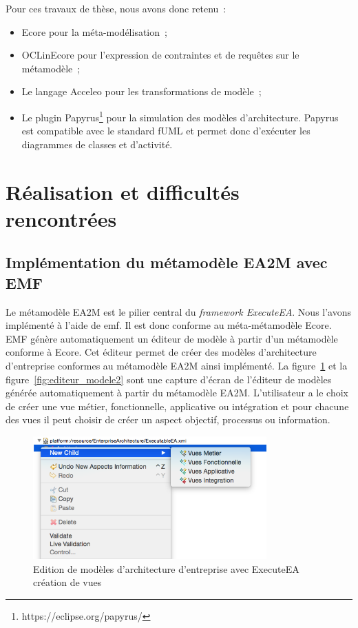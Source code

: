 Pour ces travaux de thèse, nous avons donc retenu~:

\begin{itemize}
    \item Ecore pour la méta-modélisation~;

    \item OCLinEcore pour l'expression de contraintes et de requêtes sur le métamodèle~;

    \item Le langage Acceleo pour les transformations de modèle~;

    \item Le plugin Papyrus\footnote{https://eclipse.org/papyrus/} pour la simulation des modèles d'architecture. Papyrus est compatible avec le standard fUML et permet donc d'exécuter les diagrammes de classes et d'activité. 

\end{itemize}


\section{Réalisation et difficultés rencontrées}

    \subsection{Implémentation du métamodèle EA2M avec EMF}

    Le métamodèle EA2M est le pilier central du \emph{framework ExecuteEA}. Nous l'avons implémenté à l'aide de \gls{emf}.
    Il est donc conforme au méta-métamodèle Ecore. 
    EMF génère automatiquement un éditeur de modèle à partir d'un métamodèle conforme à Ecore. Cet éditeur permet de créer des modèles d'architecture d'entreprise conformes au métamodèle EA2M ainsi implémenté. La figure~\ref{fig:editeur_modele1} et la figure~\ref{fig:editeur_modele2} sont une capture d'écran de l'éditeur de modèles générée automatiquement à partir du métamodèle EA2M. L'utilisateur a le choix de créer une vue métier, fonctionnelle,
    applicative ou intégration et pour chacune des vues il peut choisir de créer un aspect objectif, processus ou information.


    \begin{figure}[!htbp]
     \begin{center}
      \includegraphics[width=0.8\textwidth]{figures/5_implementation/editeur_modele1.png}
     \end{center}
     \caption{Edition de modèles d'architecture d'entreprise avec ExecuteEA\\création de vues}
     \label{fig:editeur_modele1}
    \end{figure}

